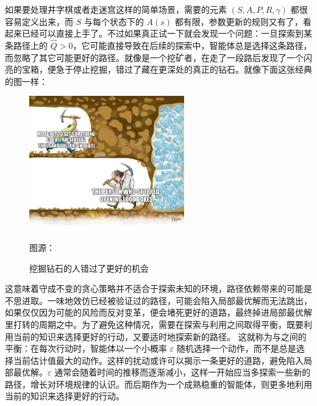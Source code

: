如果要处理井字棋或者走迷宫这样的简单场景，需要的元素 $(S, A, P, R, \gamma)$ 都很容易定义出来，而 $S$ 与每个状态下的 $A(s)$ 都有限，参数更新的规则又有了，看起来已经可以直接上手了。不过如果真正试一下就会发现一个问题：一旦探索到某条路径上的 $\hat Q > 0$，它可能直接导致在后续的探索中，智能体总是选择这条路径，而忽略了其它可能更好的路径。就像是一个挖矿者，在走了一段路后发现了一个闪亮的宝箱，便急于停止挖掘，错过了藏在更深处的真正的钻石。就像下面这张经典的图一样：
\begin{figure}[H]
    \centering
    \includegraphics[width=0.6\textwidth]{img/digging_for_diamonds.png}
    \caption{挖掘钻石的人错过了更好的机会}
    {图源：}
\end{figure}

这意味着守成不变的贪心策略并不适合于探索未知的环境，路径依赖带来的可能是不思进取。一味地效仿已经被验证过的路径，可能会陷入局部最优解而无法跳出，如果仅仅因为可能的风险而反对变革，便会堵死更好的道路，最终掉进局部最优解里打转的周期之中。为了避免这种情况，需要在探索与利用之间取得平衡，既要利用当前的知识来选择更好的行动，又要适时地探索新的路径。
这就称为与之间的平衡：在每次行动时，智能体以一个小概率 $\varepsilon$ 随机选择一个动作，而不是总是选择当前估计值最大的动作。这样的扰动或许可以揭示一条更好的道路，避免陷入局部最优解。$\varepsilon$ 通常会随着时间的推移而逐渐减小，这样一开始应当多探索一些新的路径，增长对环境规律的认识。而后期作为一个成熟稳重的智能体，则更多地利用当前的知识来选择更好的行动。

